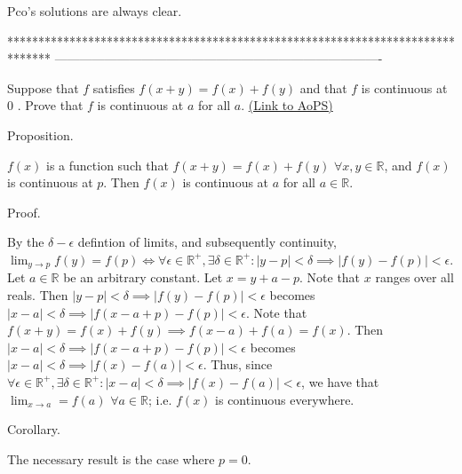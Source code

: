 \begin{solution}
	Pco's solutions are always clear.
\end{solution}
*******************************************************************************
-------------------------------------------------------------------------------

\begin{problem}
	Suppose that $f $ satisfies $f(x+y)=f(x)+f(y) $ and that $f $ is continuous at $0 $ . Prove that $f $ is continuous at $a $ for all $a $.
	\flushright \href{https://artofproblemsolving.com/community/c6h440236}{(Link to AoPS)}
\end{problem}



\begin{solution}
	\begin{bolded}Proposition.\end{bolded} $f(x)$ is a function such that $f(x+y)=f(x)+f(y)$ $\forall x,y\in\mathbb{R}$, and $f(x)$ is continuous at $p$. Then $f(x)$ is continuous at $a$ for all $a\in\mathbb{R}$.

\begin{bolded}Proof.\end{bolded}
By the $\delta-\epsilon$ defintion of limits, and subsequently continuity, $\lim_{y\to p}{f(y)}=f(p)\iff \forall\epsilon\in\mathbb{R}^{+},\exists\delta\in\mathbb{R}^{+}:|y-p|<\delta\implies |f(y)-f(p)|<\epsilon$.
Let $a\in\mathbb{R}$ be an arbitrary constant. Let $x=y+a-p$. Note that $x$ ranges over all reals.
Then $|y-p|<\delta\implies |f(y)-f(p)|<\epsilon$ becomes $|x-a|<\delta\implies |f(x-a+p)-f(p)|<\epsilon$.
Note that $f(x+y)=f(x)+f(y)\implies f(x-a)+f(a)=f(x)$.
Then $|x-a|<\delta\implies |f(x-a+p)-f(p)|<\epsilon$ becomes $|x-a|<\delta\implies |f(x)-f(a)|<\epsilon$.
Thus, since $\forall\epsilon\in\mathbb{R}^{+},\exists\delta\in\mathbb{R}^{+}:|x-a|<\delta\implies |f(x)-f(a)|<\epsilon$, we have that $\lim_{x\to a}=f(a)$ $\forall a\in\mathbb{R}$; i.e. $f(x)$ is continuous everywhere.

\begin{bolded}Corollary.\end{bolded} The necessary result is the case where $p=0$.
\end{solution}



